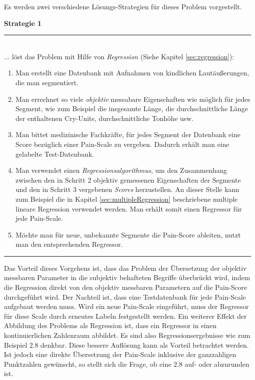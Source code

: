 Es werden zwei verschiedene Lösungs-Strategien für dieses Problem vorgestellt. 

\vspace{5mm}

\textbf{Strategie 1} \noindent\rule{0.83\linewidth}{0.3pt}\\
... löst das Problem mit Hilfe von \emph{Regression} (Siehe Kapitel \ref{sec:regression}):
\begin{enumerate}
 \item Man erstellt eine Datenbank mit Aufnahmen von kindlichen Lautäußerungen, die man  segmentiert.
 \item Man errechnet \glqq so viele \emph{objektiv} messabare Eigenschaften wie möglich\grqq{} für jedes Segment, wie zum Beispiel die insgesamte Länge, die durchschnittliche Länge der enthaltenen Cry-Units, durchschnittliche Tonhöhe usw.
 \item Man bittet medizinische Fachkräfte, für jedes Segment der Datenbank eine Score bezüglich einer Pain-Scale zu vergeben. Dadurch erhält man eine gelabelte Test-Datenbank.
 \item  Man verwendet einen \emph{Regressionsalgorithmus}, um den Zusammenhang zwischen den in Schritt 2 objektiv gemessenen Eigenschaften der Segmente und den in Schritt 3 vergebenen \emph{Scores} herzustellen. An dieser Stelle kann zum Beispiel die in Kapitel \ref{sec:multipleRegression} beschriebene multiple lineare Regression verwendet werden. Man erhält somit einen Regressor für jede Pain-Scale.
 \item Möchte man für neue, unbekannte Segmente die Pain-Score ableiten, nutzt man den entsprechenden Regressor.
\end{enumerate}
\noindent\rule{\linewidth}{0.3pt}

Das Vorteil dieses Vorgehens ist, dass das Problem der Übersetzung der objektiv messbaren Parameter in die subjektiv behafteten Begriffe überbrückt wird, indem die Regression direkt von den objektiv messbaren Parametern auf  die Pain-Score durchgeführt wird. Der Nachteil ist, dass eine Testdatenbank für jede Pain-Scale aufgebaut werden muss. Wird ein neue Pain-Scale eingeführt, muss der Regressor für diese Scale durch erneutes Labeln festgestellt werden. Ein weiterer Effekt der Abbildung des Problems als Regression ist, dass ein Regressor in einen kontinuierlichen Zahlenraum abbildet. Es sind also Regressionsergebnisse wie zum Beispiel $2.8$ denkbar. Diese \glqq bessere Auflösung\grqq{} kann als Vorteil betrachtet werden. Ist jedoch eine direkte Übersetzung der Pain-Scale inklusive der ganzzahligen Punktzahlen gewünscht, so stellt sich die Frage, ob eine $2.8$ auf- oder abzurunden ist.

